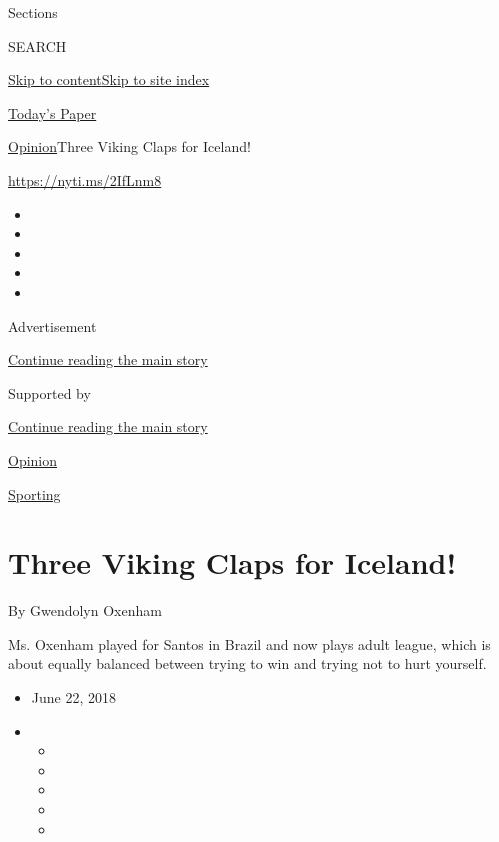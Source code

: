 Sections

SEARCH

\protect\hyperlink{site-content}{Skip to
content}\protect\hyperlink{site-index}{Skip to site index}

\href{https://myaccount.nytimes.com/auth/login?response_type=cookie\&client_id=vi}{}

\href{https://www.nytimes.com/section/todayspaper}{Today's Paper}

\href{/section/opinion}{Opinion}\textbar{}Three Viking Claps for
Iceland!

\href{https://nyti.ms/2IfLnm8}{https://nyti.ms/2IfLnm8}

\begin{itemize}
\item
\item
\item
\item
\item
\end{itemize}

Advertisement

\protect\hyperlink{after-top}{Continue reading the main story}

Supported by

\protect\hyperlink{after-sponsor}{Continue reading the main story}

\href{/section/opinion}{Opinion}

\href{/column/sporting}{Sporting}

\hypertarget{three-viking-claps-for-iceland}{%
\section{Three Viking Claps for
Iceland!}\label{three-viking-claps-for-iceland}}

By Gwendolyn Oxenham

Ms. Oxenham played for Santos in Brazil and now plays adult league,
which is about equally balanced between trying to win and trying not to
hurt yourself.

\begin{itemize}
\item
  June 22, 2018
\item
  \begin{itemize}
  \item
  \item
  \item
  \item
  \item
  \end{itemize}
\end{itemize}

